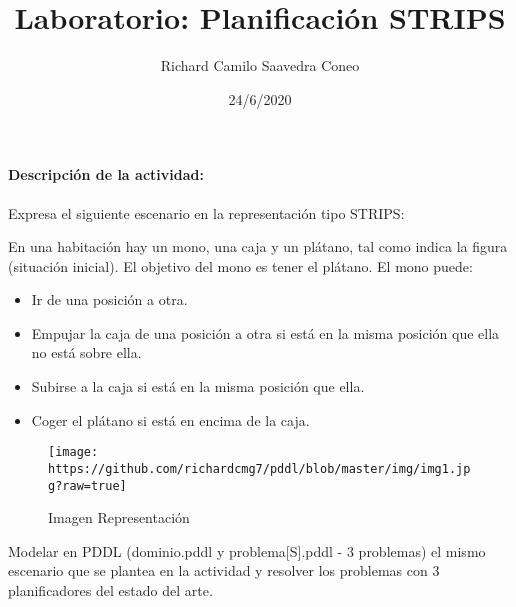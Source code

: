 \documentclass[
]{article}
\title{Laboratorio: Planificación STRIPS}
\author{Richard Camilo Saavedra Coneo}
\date{24/6/2020}
\providecommand{\tightlist}{%
  \setlength{\itemsep}{0pt}\setlength{\parskip}{0pt}}
\begin{document}
\maketitle

\hypertarget{descripciuxf3n-de-la-actividad}{%
\paragraph{Descripción de la
actividad:}\label{descripciuxf3n-de-la-actividad}}

Expresa el siguiente escenario en la representación tipo STRIPS:

En una habitación hay un mono, una caja y un plátano, tal como indica la
figura (situación inicial). El objetivo del mono es tener el plátano. El
mono puede:

\begin{itemize}
\tightlist
\item
  Ir de una posición a otra.
\item
  Empujar la caja de una posición a otra si está en la misma posición
  que ella no está sobre ella.
\item
  Subirse a la caja si está en la misma posición que ella.
\item
  Coger el plátano si está en encima de la caja.
\end{itemize}

\begin{figure}
\centering
\texttt{[image: https://github.com/richardcmg7/pddl/blob/master/img/img1.jpg?raw=true]}
\caption{Imagen Representación}
\end{figure}

Modelar en PDDL (dominio.pddl y problema{[}S{]}.pddl - 3 problemas) el
mismo escenario que se plantea en la actividad y resolver los problemas
con 3 planificadores del estado del arte.
\end{document}

